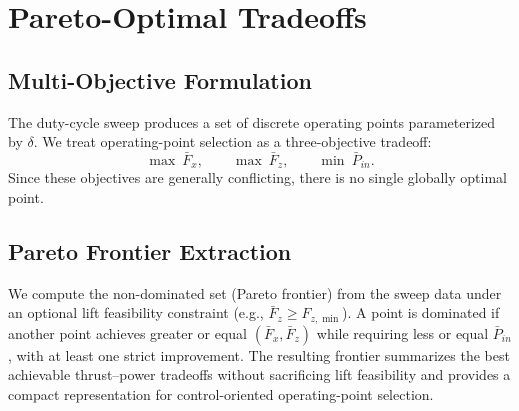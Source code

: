 \section{Pareto-Optimal Tradeoffs}
\subsection{Multi-Objective Formulation}
The duty-cycle sweep produces a set of discrete operating points parameterized by $\delta$.
We treat operating-point selection as a three-objective tradeoff:
\begin{equation}
\max~\bar{F}_x,\qquad \max~\bar{F}_z,\qquad \min~\bar{P}_{in}.
\end{equation}
Since these objectives are generally conflicting, there is no single globally optimal point.

\subsection{Pareto Frontier Extraction}
We compute the non-dominated set (Pareto frontier) from the sweep data under an optional lift feasibility constraint (e.g., $\bar{F}_z \ge F_{z,\min}$).
A point is dominated if another point achieves greater or equal $(\bar{F}_x,\bar{F}_z)$ while requiring less or equal $\bar{P}_{in}$, with at least one strict improvement.
The resulting frontier summarizes the best achievable thrust--power tradeoffs without sacrificing lift feasibility and provides a compact representation for control-oriented operating-point selection.
